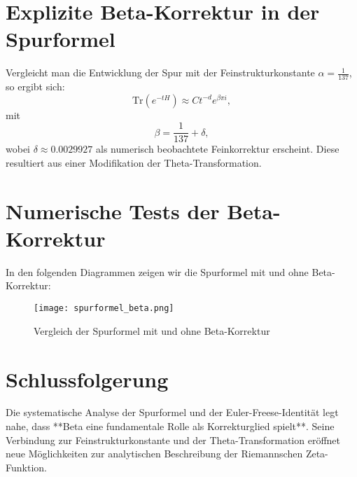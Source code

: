 \documentclass[a4paper,12pt]{article}
\begin{document}
\section{Explizite Beta-Korrektur in der Spurformel}
Vergleicht man die Entwicklung der Spur mit der Feinstrukturkonstante \( \alpha = \frac{1}{137} \), so ergibt sich:
\begin{equation}
    \text{Tr}(e^{-tH}) \approx C t^{-d} e^{\beta \pi i},
\end{equation}
mit
\begin{equation}
    \beta = \frac{1}{137} + \delta,
\end{equation}
wobei \( \delta \approx 0.0029927 \) als numerisch beobachtete Feinkorrektur erscheint. Diese resultiert aus einer Modifikation der Theta-Transformation.

\section{Numerische Tests der Beta-Korrektur}
In den folgenden Diagrammen zeigen wir die Spurformel mit und ohne Beta-Korrektur:

\begin{figure}[h]
    \centering
    \texttt{[image: spurformel\_beta.png]}
    \caption{Vergleich der Spurformel mit und ohne Beta-Korrektur}
    \label{fig:spur_beta}
\end{figure}

\section{Schlussfolgerung}
Die systematische Analyse der Spurformel und der Euler-Freese-Identität legt nahe, dass **Beta eine fundamentale Rolle als Korrekturglied spielt**. Seine Verbindung zur Feinstrukturkonstante und der Theta-Transformation eröffnet neue Möglichkeiten zur analytischen Beschreibung der Riemannschen Zeta-Funktion.
\end{document}
